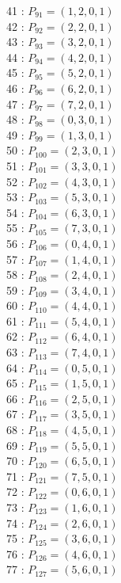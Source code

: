 \documentclass{article}
\begin{document}
{\begin{multicols}{3}
41 : $P_{91}=( 1, 2, 0, 1 )$\\
42 : $P_{92}=( 2, 2, 0, 1 )$\\
43 : $P_{93}=( 3, 2, 0, 1 )$\\
44 : $P_{94}=( 4, 2, 0, 1 )$\\
45 : $P_{95}=( 5, 2, 0, 1 )$\\
46 : $P_{96}=( 6, 2, 0, 1 )$\\
47 : $P_{97}=( 7, 2, 0, 1 )$\\
48 : $P_{98}=( 0, 3, 0, 1 )$\\
49 : $P_{99}=( 1, 3, 0, 1 )$\\
50 : $P_{100}=( 2, 3, 0, 1 )$\\
51 : $P_{101}=( 3, 3, 0, 1 )$\\
52 : $P_{102}=( 4, 3, 0, 1 )$\\
53 : $P_{103}=( 5, 3, 0, 1 )$\\
54 : $P_{104}=( 6, 3, 0, 1 )$\\
55 : $P_{105}=( 7, 3, 0, 1 )$\\
56 : $P_{106}=( 0, 4, 0, 1 )$\\
57 : $P_{107}=( 1, 4, 0, 1 )$\\
58 : $P_{108}=( 2, 4, 0, 1 )$\\
59 : $P_{109}=( 3, 4, 0, 1 )$\\
60 : $P_{110}=( 4, 4, 0, 1 )$\\
61 : $P_{111}=( 5, 4, 0, 1 )$\\
62 : $P_{112}=( 6, 4, 0, 1 )$\\
63 : $P_{113}=( 7, 4, 0, 1 )$\\
64 : $P_{114}=( 0, 5, 0, 1 )$\\
65 : $P_{115}=( 1, 5, 0, 1 )$\\
66 : $P_{116}=( 2, 5, 0, 1 )$\\
67 : $P_{117}=( 3, 5, 0, 1 )$\\
68 : $P_{118}=( 4, 5, 0, 1 )$\\
69 : $P_{119}=( 5, 5, 0, 1 )$\\
70 : $P_{120}=( 6, 5, 0, 1 )$\\
71 : $P_{121}=( 7, 5, 0, 1 )$\\
72 : $P_{122}=( 0, 6, 0, 1 )$\\
73 : $P_{123}=( 1, 6, 0, 1 )$\\
74 : $P_{124}=( 2, 6, 0, 1 )$\\
75 : $P_{125}=( 3, 6, 0, 1 )$\\
76 : $P_{126}=( 4, 6, 0, 1 )$\\
77 : $P_{127}=( 5, 6, 0, 1 )$\\

\end{multicols}}
\end{document}
